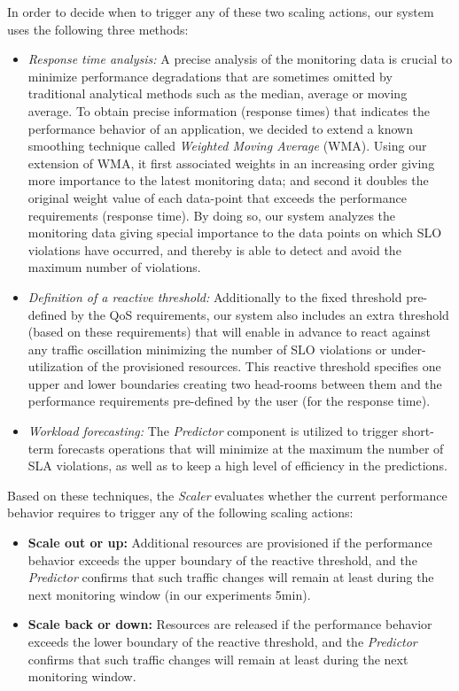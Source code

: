 In order to decide when to trigger any of these two scaling actions, our system uses the following three methods: 
\begin{itemize}
\item \emph{Response time analysis:} A precise analysis of the monitoring data is crucial to minimize performance degradations that are sometimes omitted by traditional analytical methods such as the median, average or moving average. To obtain precise information (response times) that indicates the performance behavior of an application, we decided to extend a known smoothing technique called \emph{Weighted Moving Average} (WMA). Using our extension of WMA, it first associated weights in an increasing order giving more importance to the latest monitoring data; and second it doubles the original weight value of each data-point that exceeds the performance requirements (response time). By doing so, our system analyzes the monitoring data giving special importance to the data points on which SLO violations have occurred, and thereby is able to detect and avoid the maximum number of violations.

\item \emph{Definition of a reactive threshold:} Additionally to the fixed threshold pre-defined by the QoS requirements, our system also includes an extra threshold (based on these requirements) that will enable in advance to react against any traffic oscillation minimizing the number of SLO violations or under-utilization of the provisioned resources. This reactive threshold specifies one upper and lower boundaries creating two head-rooms between them and the performance requirements pre-defined by the user (for the response time).

\item \emph{Workload forecasting: }  The \emph{Predictor} component is utilized to trigger short-term forecasts operations that will minimize at the maximum the number of SLA violations, as well as to keep a high level of efficiency in the predictions. 
\end{itemize}

Based on these techniques, the \emph{Scaler} evaluates whether the current performance behavior requires to trigger any of the following scaling actions:

\begin{itemize}

\item \textbf{Scale out or up:} Additional resources are provisioned if the performance behavior exceeds the upper boundary of the reactive threshold, and the \emph{Predictor} confirms that such traffic changes will remain at least during the next monitoring window (in our experiments 5min). 

\item \textbf{Scale back or down:} Resources are released if the performance behavior exceeds the lower boundary of the reactive threshold, and the \emph{Predictor} confirms that such traffic changes will remain at least during the next monitoring window.

\end{itemize}


